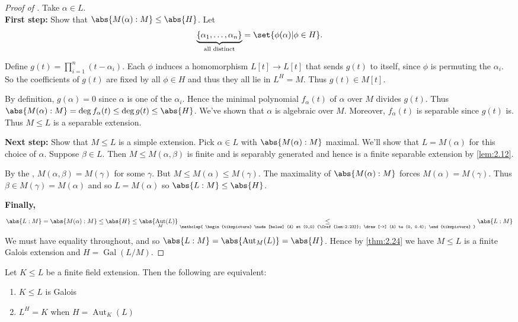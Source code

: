 \documentclass{article}
\DeclareMathOperator{\Aut}{Aut}
\DeclareMathOperator{\Gal}{Gal}
\begin{document}
\begin{proof}[Proof of ]
    Take $\alpha \in L$. \\
    \textbf{First step:} Show that $\abs{M(\alpha):M} \leq \abs{H}$.
    Let \begin{equation*}\underbrace{\{\alpha_1, \dotsc, \alpha_n\}}_{\text{all distinct}} = \set{\phi(\alpha) | \phi \in H}.\end{equation*}

    Define $g(t) = \prod_{i=1}^n (t-\alpha_i)$.
    Each $\phi$ induces a homomorphism $L[t] \to L[t]$ that sends $g(t)$ to itself, since $\phi$ is permuting the $\alpha_i$.
    So the coefficients of $g(t)$ are fixed by all $\phi \in H$ and thus they all lie in $L^H = M$.
    Thus $g(t) \in M[t]$.

    By definition, $g(\alpha) = 0$ since $\alpha$ is one of the $\alpha_i$.
    Hence the minimal polynomial $f_\alpha(t)$ of $\alpha$ over $M$ divides $g(t)$.
    Thus $\abs{M(\alpha):M} = \deg f_\alpha(t) \leq \deg g(t) \leq \abs{H}$.
    We've shown that $\alpha$ is algebraic over $M$.
    Moreover, $f_\alpha(t)$ is separable since $g(t)$ is.
    Thus $M \leq L$ is a separable extension.

    \textbf{Next step:} Show that $M \leq L$ is a simple extension.
    Pick $\alpha \in L$ with $\abs{M(\alpha):M}$ maximal.
    We'll show that $L = M(\alpha)$ for this choice of $\alpha$.
    Suppose $\beta \in L$. Then $M \leq M(\alpha, \beta)$ is finite and is separably generated and hence is a finite separable extension by \cref{lem:2.12}.

    By the , $M(\alpha, \beta) = M(\gamma)$ for some $\gamma$.
    But $M \leq M(\alpha) \leq M(\gamma)$.
    The maximality of $\abs{M(\alpha):M}$ forces $M(\alpha) = M(\gamma)$.
    Thus $\beta \in M(\gamma) = M(\alpha)$ and so $L = M(\alpha)$ so $\abs{L:M} \leq \abs{H}$.

    \textbf{Finally,}
    \begin{equation*}
        \abs{L:M} = \abs{M(\alpha):M} \leq \abs{H} \leq \abs{\Aut_M(L)} \underset{\mathclap{
        \begin{tikzpicture}
            \node[below] (A) at (0,0) {\Cref{lem:2.23}};
            \draw[->] (A) to (0, 0.4);
        \end{tikzpicture}
        }}{\leq} \abs{L:M}
    \end{equation*}
    We must have equality throughout, and so $\abs{L:M} = \abs{\Aut_M(L)} = \abs{H}$.
    Hence by \cref{thm:2.24} we have $M \leq L$ is a finite Galois extension and $H = \Gal(L/M)$.
\end{proof}
\begin{nthm}\label{thm:3.4}
    Let $K \leq L$ be a finite field extension. Then the following are equivalent:
    \begin{enumerate}[label=(\roman*)]
        \item $K \leq L$ is Galois
        \item $L^H = K$ when $H = \Aut_K(L)$
    \end{enumerate}
\end{nthm}
\end{document}
